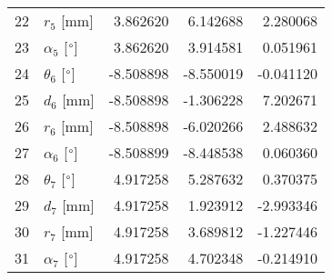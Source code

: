 \documentclass{standalone}%
\begin{document}
\begin{tabular}{llrrr}
22 &              $r_{5}$ [mm] &  3.862620 &   6.142688 &   2.280068 \\
23 &  $\alpha_{5}$ [$\degree$] &  3.862620 &   3.914581 &   0.051961 \\
24 &  $\theta_{6}$ [$\degree$] & -8.508898 &  -8.550019 &  -0.041120 \\
25 &              $d_{6}$ [mm] & -8.508898 &  -1.306228 &   7.202671 \\
26 &              $r_{6}$ [mm] & -8.508898 &  -6.020266 &   2.488632 \\
27 &  $\alpha_{6}$ [$\degree$] & -8.508899 &  -8.448538 &   0.060360 \\
28 &  $\theta_{7}$ [$\degree$] &  4.917258 &   5.287632 &   0.370375 \\
29 &              $d_{7}$ [mm] &  4.917258 &   1.923912 &  -2.993346 \\
30 &              $r_{7}$ [mm] &  4.917258 &   3.689812 &  -1.227446 \\
31 &  $\alpha_{7}$ [$\degree$] &  4.917258 &   4.702348 &  -0.214910 \\
\bottomrule
\end{tabular}
%
\end{document}
